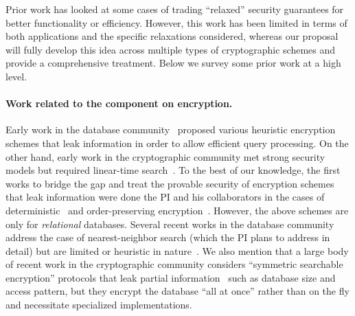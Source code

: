 Prior work has looked at some cases of trading ``relaxed'' security guarantees for better functionality or efficiency. However, this work has been limited in terms of both applications and the specific relaxations considered, whereas our proposal will fully develop this idea across multiple types of cryptographic schemes and provide a comprehensive treatment.
Below we survey some prior work at a high level. 


\paragraph*{\large{Work related to the component on encryption.}}
Early work in the database community~\cite{} proposed various heuristic encryption schemes  that leak  information in order to allow efficient query processing. 
On the other hand, early work in the cryptographic community met strong security models but required linear-time search~\cite{}.
To the best of our knowledge, the first works to bridge the gap and  treat the provable security of encryption schemes  that leak information were done the PI and his collaborators in the cases of deterministic~\cite{} and order-preserving encryption~\cite{}.   
However, the above schemes are only for \emph{relational} databases.
Several recent works in the database community address the case of nearest-neighbor search  (which the PI plans to address in detail)  but are limited or heuristic in nature~\cite{}.
We also mention that a large body of recent work in the cryptographic community  considers ``symmetric searchable encryption'' protocols that leak  partial information~\cite{} such as database size and access pattern, but they encrypt the database ``all at once'' rather than on the fly and necessitate specialized implementations.   %

